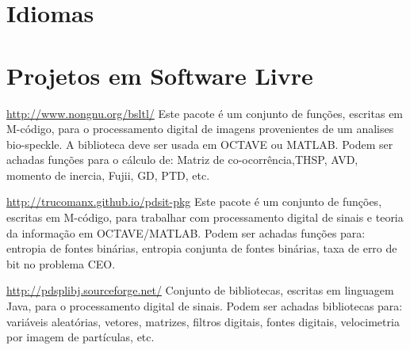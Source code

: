 \documentclass[11pt,a4paper,sans]{moderncv} %
\begin{document}



\section{Idiomas}


 
\section{Projetos em Software Livre}

			{\url{http://www.nongnu.org/bsltl/}}
			{}{}
			{Este pacote é um conjunto de funções, escritas em M-código, para o 
			processamento digital de imagens provenientes de um analises bio-speckle.
			A biblioteca deve ser usada em OCTAVE ou MATLAB.
			Podem ser achadas funções para o cálculo de: 
			Matriz de co-ocorrência,THSP, AVD, momento de inercia,
			Fujii, GD, PTD, etc.}

			{\url{http://trucomanx.github.io/pdsit-pkg}}
			{}{}
			{Este pacote é um conjunto de funções, escritas em M-código, para trabalhar 
			com processamento digital de sinais e teoria da 
			informação em OCTAVE/MATLAB. Podem ser achadas 
			funções para: entropia de fontes binárias, 
			entropia conjunta de fontes binárias, 
			taxa de erro de bit no problema CEO. }
			
			{\url{http://pdsplibj.sourceforge.net/}}
			{}{}
			{Conjunto de bibliotecas, escritas em linguagem Java, para 
			o processamento digital de sinais. Podem ser achadas 
			bibliotecas para: variáveis aleatórias, 
			vetores, matrizes, filtros 
			digitais, fontes digitais, velocimetria por imagem de partículas, etc.}
\end{document}
